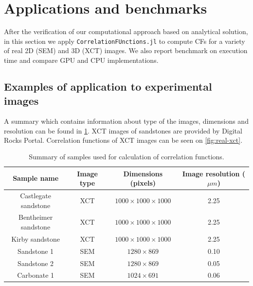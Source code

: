 \documentclass[reprint,amsmath,amssymb,aps,pre,showkeys,showpacs,nofootinbib]{revtex4-1}
\newcommand{\code}[1]{\colorbox{light-gray}{\texttt{#1}}}
\begin{document}
\section{Applications and benchmarks}
After the verification of our computational approach based on analytical
solution, in this section we apply \code{CorrelationFUnctions.jl} to compute CFs
for a variety of real 2D (SEM) and 3D (XCT) images. We also report benchmark on execution time and
compare GPU and CPU implementations.

\subsection{Examples of application to experimental images}
\label{sec:examples}
A summary which contains information about type of the images, dimensions and resolution
can be found in \cref{tab:samples}. XCT images of sandstones are provided by
Digital Rocks Portal\cite{DigitalRocks}. Correlation functions of XCT images
can be seen on \cref{fig:real-xct}.

\begin{table}[!pt]
  \centering
  \begin{ruledtabular}
    \begin{tabular}{|c|c|c|c|}
      Sample name & Image type & Dimensions (pixels) & Image resolution ($\mu m$) \\
      \hline
      Castlegate sandstone & XCT & $1000 \times 1000 \times 1000$ & 2.25 \\
      Bentheimer sandstone & XCT & $1000 \times 1000 \times 1000$ & 2.25 \\
      Kirby sandstone      & XCT & $1000 \times 1000 \times 1000$ & 2.25 \\
      Sandstone 1 & SEM &  $1280 \times 869$ & 0.10 \\
      Sandstone 2 & SEM &  $1280 \times 869$ & 0.05 \\
      Carbonate 1 & SEM &  $1024 \times 691$ & 0.06
    \end{tabular}
  \end{ruledtabular}
  \caption{Summary of samples used for calculation of correlation functions.}
  \label{tab:samples}
\end{table}
\end{document}
